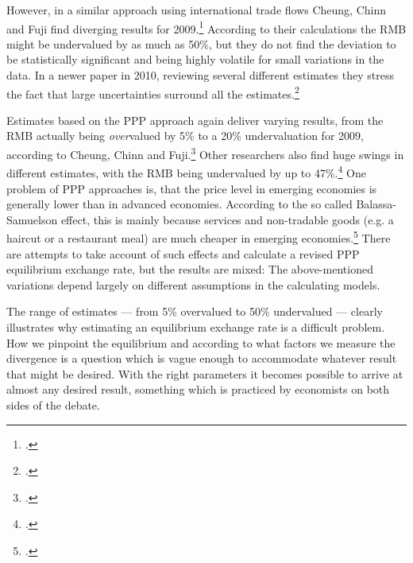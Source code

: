 However, in a similar approach using international trade flows Cheung, 
Chinn and Fuji find diverging results for 
2009.\footnote{\cite{Cheung2009}.} According to their calculations the 
RMB might be undervalued by as much as 50\%, but they do not find the 
deviation to be statistically significant and being highly volatile for 
small variations in the data. In a newer paper in 2010, reviewing 
several different estimates they stress the fact that large 
uncertainties surround all the estimates.\footnote{\cite{Cheung2010}.}

Estimates based on the PPP approach again deliver varying results, from 
the RMB actually being \emph{over}valued by 5\% to a 20\% undervaluation 
for 2009, according to Cheung, Chinn and Fuji.\footnote{\cite[pp.  
82]{Cheung2010}.} Other researchers also find huge swings in different 
estimates, with the RMB being undervalued by up to 
47\%.\footnote{\cite[pp. 72]{Subramanian2010}.} One problem of PPP 
approaches is, that the price level in emerging economies is generally 
lower than in advanced economies. According to the so called 
Balassa-Samuelson effect, this is mainly because services and 
non-tradable goods (e.g. a haircut or a restaurant meal) are much 
cheaper in emerging economies.\footnote{\cite[pp. 57]{Frankel2010}.} 
There are attempts to take account of such effects and calculate a 
revised PPP equilibrium exchange rate, but the results are mixed: The 
above-mentioned variations depend largely on different assumptions in 
the calculating models.

The range of estimates --- from 5\% overvalued to 50\% undervalued --- 
clearly illustrates why estimating an equilibrium exchange rate is a 
difficult problem. How we pinpoint the equilibrium and according to what 
factors we measure the divergence is a question which is vague enough to 
accommodate whatever result that might be desired. With the right 
parameters it becomes possible to arrive at almost any desired result, 
something which is practiced by economists on both sides of the debate.


